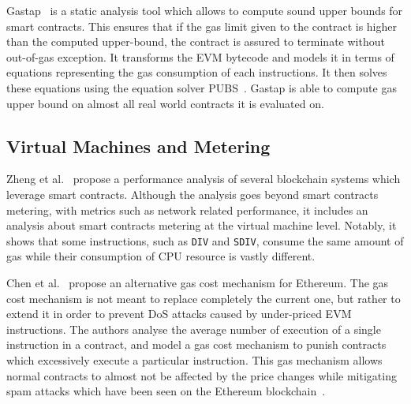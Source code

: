 Gastap~\cite{DBLP:journals/corr/abs-1811-10403} is a static analysis tool which allows to compute sound upper bounds for smart contracts. This ensures that if the gas limit given to the contract is higher than the computed upper-bound, the contract is assured to terminate without out-of-gas exception. It transforms the EVM bytecode and models it in terms of equations representing the gas consumption of each instructions. It then solves these equations using the equation solver PUBS~\cite{10.1007/978-3-540-69166-2_15}. Gastap is able to compute gas upper bound on almost all real world contracts it is evaluated on.


\subsection{Virtual Machines and Metering}
Zheng et al.~\cite{8449244} propose a performance analysis of several blockchain systems which leverage smart contracts. Although the analysis goes beyond smart contracts metering, with metrics such as network related performance, it includes an analysis about smart contracts metering at the virtual machine level. Notably, it shows that some instructions, such as \lstinline{DIV} and \lstinline{SDIV}, consume the same amount of gas while their consumption of CPU resource is vastly different.

Chen et al.~\cite{Chen2017Metering} propose an alternative gas cost mechanism for Ethereum. The gas cost mechanism is not meant to replace completely the current one, but rather to extend it in order to prevent DoS attacks caused by under-priced EVM instructions. The authors analyse the average number of execution of a single instruction in a contract, and model a gas cost mechanism to punish contracts which excessively execute a particular instruction. This gas mechanism allows normal contracts to almost not be affected by the price changes while mitigating spam attacks which have been seen on the Ethereum blockchain~\cite{transaction-spam-attack}.
